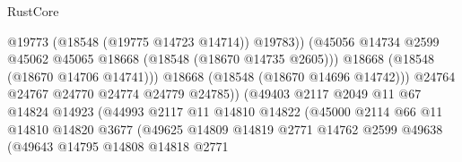 \begin{lexlean}{RustCore}
\begin{coremodule}
                                                @19773
                                                (@18548 (@19775 @14723 @14714))
                                                @19783))
                                            (@45056
                                              @14734
                                              @2599
                                              @45062
                                              @45065
                                              @18668
                                              (@18548 (@18670 @14735 @2605)))
                                            @18668
                                            (@18548 (@18670 @14706 @14741)))
                                          @18668
                                          (@18548 (@18670 @14696 @14742)))
                                        @24764
                                        @24767
                                        @24770
                                        @24774
                                        @24779
                                        @24785))
                                    (@49403
                                      @2117
                                      @2049
                                      @11
                                      @67
                                      @14824
                                      @14923
                                      (@44993
                                        @2117
                                        @11
                                        @14810
                                        @14822
                                        (@45000
                                          @2114
                                          @66
                                          @11
                                          @14810
                                          @14820
                                          @3677
                                          (@49625
                                            @14809
                                            @14819
                                            @2771
                                            @14762
                                            @2599
                                            @49638
                                            (@49643
                                              @14795
                                              @14808
                                              @14818
                                              @2771

\end{coremodule}
\end{lexlean}
